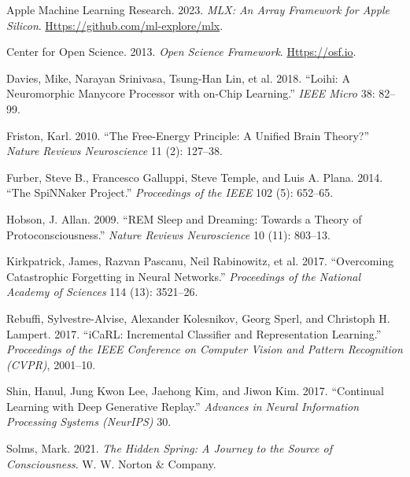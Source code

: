 \documentclass[
]{article}
\newlength{\cslhangindent}
\newenvironment{CSLReferences}[2] %
 {\begin{list}{}{%
  \setlength{\itemindent}{0pt}
  \setlength{\leftmargin}{0pt}
  \setlength{\parsep}{0pt}
  \ifodd #1
   \setlength{\leftmargin}{\cslhangindent}
   \setlength{\itemindent}{-1\cslhangindent}
  \fi
  \setlength{\itemsep}{#2\baselineskip}}}
 {\end{list}}
\begin{document}
\protect{}\label{refs}
\begin{CSLReferences}{1}{1}
Apple Machine Learning Research. 2023. \emph{{MLX}: An Array Framework
for Apple Silicon}.
\href{https://github.com/ml-explore/mlx}{Https://github.com/ml-explore/mlx}.

Center for Open Science. 2013. \emph{Open Science Framework}.
\href{https://osf.io}{Https://osf.io}.

{Davies, Mike, Narayan Srinivasa, Tsung-Han Lin, et al.} 2018.
{``{Loihi}: A Neuromorphic Manycore Processor with on-Chip Learning.''}
\emph{IEEE Micro} 38: 82--99.

Friston, Karl. 2010. {``The Free-Energy Principle: A Unified Brain
Theory?''} \emph{Nature Reviews Neuroscience} 11 (2): 127--38.

Furber, Steve B., Francesco Galluppi, Steve Temple, and Luis A. Plana.
2014. {``The {SpiNNaker} Project.''} \emph{Proceedings of the IEEE} 102
(5): 652--65.

Hobson, J. Allan. 2009. {``{REM} Sleep and Dreaming: Towards a Theory of
Protoconsciousness.''} \emph{Nature Reviews Neuroscience} 10 (11):
803--13.

{Kirkpatrick, James, Razvan Pascanu, Neil Rabinowitz, et al.} 2017.
{``Overcoming Catastrophic Forgetting in Neural Networks.''}
\emph{Proceedings of the National Academy of Sciences} 114 (13):
3521--26.

Rebuffi, Sylvestre-Alvise, Alexander Kolesnikov, Georg Sperl, and
Christoph H. Lampert. 2017. {``{iCaRL}: Incremental Classifier and
Representation Learning.''} \emph{Proceedings of the IEEE Conference on
Computer Vision and Pattern Recognition (CVPR)}, 2001--10.

Shin, Hanul, Jung Kwon Lee, Jaehong Kim, and Jiwon Kim. 2017.
{``Continual Learning with Deep Generative Replay.''} \emph{Advances in
Neural Information Processing Systems ({NeurIPS})} 30.

Solms, Mark. 2021. \emph{The Hidden Spring: A Journey to the Source of
Consciousness}. W. W. Norton \& Company.


\end{CSLReferences}
\end{document}
